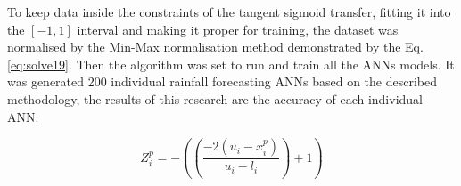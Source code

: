 To keep data inside the constraints of the tangent sigmoid transfer, fitting it into the $[-1, 1]$ interval and making it proper for training, the dataset was normalised by the Min-Max normalisation method demonstrated by the Eq. \ref{eq:solve19}. Then the algorithm was set to run and train all the ANNs models. It was generated 200 individual rainfall forecasting ANNs based on the described methodology, the results of this research are the accuracy of each individual ANN.

\begin{equation}
 \label{eq:solve19}
 Z_i^p = -((\frac{-2(u_i - x_i^p)}{u_i - l_i}) + 1)
\end{equation}

%

